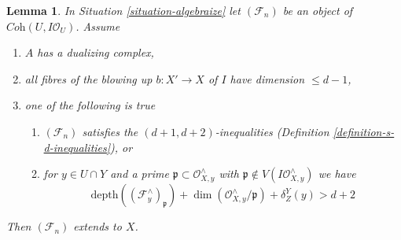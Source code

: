\documentclass[10pt,a4paper]{amsart}
\theoremstyle{plain}
\newtheorem{lemma}[subsection]{Lemma}
\theoremstyle{definition}
\theoremstyle{remark}
\numberwithin{equation}{subsection}
\begin{document}
\begin{lemma}
\label{lemma-blowup}
In Situation \ref{situation-algebraize} let $(\mathcal{F}_n)$
be an object of $\textit{Coh}(U, I\mathcal{O}_U)$. Assume
\begin{enumerate}
\item $A$ has a dualizing complex,
\item all fibres of the blowing up $b : X' \to X$ of $I$
have dimension $\leq d - 1$,
\item one of the following is true
\begin{enumerate}
\item $(\mathcal{F}_n)$ satisfies the $(d + 1, d + 2)$-inequalities
(Definition \ref{definition-s-d-inequalities}), or
\item for $y \in U \cap Y$ and a prime
$\mathfrak p \subset \mathcal{O}_{X, y}^\wedge$ with
$\mathfrak p \not \in V(I\mathcal{O}_{X, y}^\wedge)$
we have
$$
\text{depth}((\mathcal{F}^\wedge_y)_\mathfrak p) +
\dim(\mathcal{O}_{X, y}^\wedge/\mathfrak p) + \delta^Y_Z(y) > d + 2
$$
\end{enumerate}
\end{enumerate}
Then $(\mathcal{F}_n)$ extends to $X$.
\end{lemma}
\end{document}
